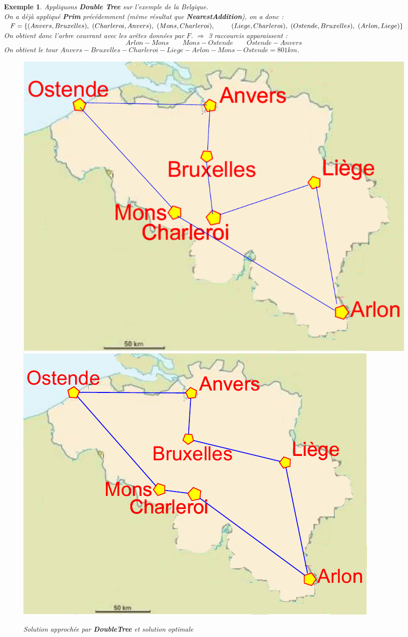 \documentclass[12pt]{article}
\newtheorem{exemple}{Exemple}[section]
\begin{document}
\begin{exemple} Appliquons \textbf{Double Tree} sur l'exemple de la Belgique. \\
On a déjà appliqué \textbf{Prim} précédemment (même résultat que \textbf{NearestAddition}), on a donc : \\
$	F = \{(Anvers,Bruxelles),\ (Charleroi, Anvers),\ (Mons, Charleroi),\ \\\indent\quad  (Liege, Charleroi),\ (Ostende, Bruxelles),\ (Arlon,
Liege)\} $ \\
On obtient donc l'arbre couvrant avec les arêtes données par $F$. $\Rightarrow$ 3 raccourcis apparaissent :
$$Arlon-Mons\qquad Mons-Ostende\qquad Ostende-Anvers$$
On obtient le tour $Anvers-Bruxelles-Charleroi-Liege-Arlon-Mons-Ostende = 801km$.
\begin{figure}[h!]
    \begin{center}
    \includegraphics[scale=0.28]{belgiqueDT.pdf}
    \includegraphics[scale=0.5]{belgiqueOPT.pdf}
    \caption{Solution approchée par \textbf{DoubleTree} et solution optimale}
    \end{center}
\end{figure}
\end{exemple}
\end{document}
